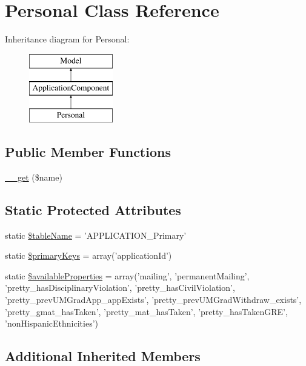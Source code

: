 \hypertarget{class_personal}{\section{Personal Class Reference}
\label{class_personal}
}
Inheritance diagram for Personal\-:\begin{figure}[H]
\begin{center}
\leavevmode
\includegraphics[height=3.000000cm]{class_personal}
\end{center}
\end{figure}
\subsection*{Public Member Functions}
\begin{DoxyCompactItemize}
\item 
\hyperlink{class_personal_ab6c66ef2fc000613fb7bb43454a55087}{\-\_\-\-\_\-get} (\$name)
\end{DoxyCompactItemize}
\subsection*{Static Protected Attributes}
\begin{DoxyCompactItemize}
\item 
static \hyperlink{class_personal_ae8c9712c2db496135b59030f0ffd4acf}{\$table\-Name} = 'A\-P\-P\-L\-I\-C\-A\-T\-I\-O\-N\-\_\-\-Primary'
\item 
static \hyperlink{class_personal_a0901c6d431e685dffd62bfbfae506f47}{\$primary\-Keys} = array('application\-Id')
\item 
static \hyperlink{class_personal_ad76d9b6b0264688fd564f3bb48eca2d9}{\$available\-Properties} = array('mailing', 'permanent\-Mailing', 'pretty\-\_\-has\-Disciplinary\-Violation', 'pretty\-\_\-has\-Civil\-Violation', 'pretty\-\_\-prev\-U\-M\-Grad\-App\-\_\-app\-Exists', 'pretty\-\_\-prev\-U\-M\-Grad\-Withdraw\-\_\-exists', 'pretty\-\_\-gmat\-\_\-has\-Taken', 'pretty\-\_\-mat\-\_\-has\-Taken', 'pretty\-\_\-has\-Taken\-G\-R\-E', 'non\-Hispanic\-Ethnicities')
\end{DoxyCompactItemize}
\subsection*{Additional Inherited Members}


